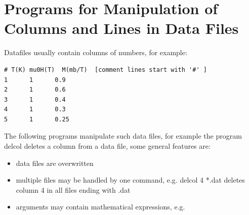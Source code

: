 \begin{description}
\end{description} 

\section{Programs for Manipulation of Columns and Lines in Data Files}

Datafiles usually contain columns of numbers, for example:

\begin{verbatim}
# T(K) mu0H(T)  M(mb/T)  [comment lines start with '#' ]
1      1      0.9
2      1      0.6
3      1      0.4
4      1      0.3
5      1      0.25
\end{verbatim}

The following programs manipulate such data files, for example
the program {\prg delcol} deletes a column from a data file,
some general features are:
\begin{itemize}
\item data files are overwritten 
\item multiple files may be handled by one command, e.g. {\prg delcol 4 *.dat} deletes column 4
in all 
files ending with .dat
\item arguments may contain mathematical expressions, e.g. 
\end{itemize}

